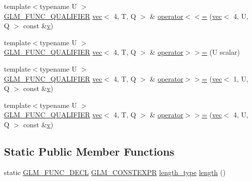 \begin{DoxyCompactItemize}
\item 
{\footnotesize template$<$typename U $>$ }\\\hyperlink{setup_8hpp_a33fdea6f91c5f834105f7415e2a64407}{G\+L\+M\+\_\+\+F\+U\+N\+C\+\_\+\+Q\+U\+A\+L\+I\+F\+I\+ER} \hyperlink{structglm_1_1vec}{vec}$<$ 4, T, Q $>$ \& \hyperlink{structglm_1_1vec_3_014_00_01_t_00_01_q_01_4_a0e69465cc359e717e6139e33aa441fde}{operator$<$$<$=} (\hyperlink{structglm_1_1vec}{vec}$<$ 4, U, Q $>$ const \&\hyperlink{_s_d_l__opengl_8h_a10a82eabcb59d2fcd74acee063775f90}{v})
\item 
{\footnotesize template$<$typename U $>$ }\\\hyperlink{setup_8hpp_a33fdea6f91c5f834105f7415e2a64407}{G\+L\+M\+\_\+\+F\+U\+N\+C\+\_\+\+Q\+U\+A\+L\+I\+F\+I\+ER} \hyperlink{structglm_1_1vec}{vec}$<$ 4, T, Q $>$ \& \hyperlink{structglm_1_1vec_3_014_00_01_t_00_01_q_01_4_a640417b459496600112faab1b74fcbf8}{operator$>$$>$=} (U scalar)
\item 
{\footnotesize template$<$typename U $>$ }\\\hyperlink{setup_8hpp_a33fdea6f91c5f834105f7415e2a64407}{G\+L\+M\+\_\+\+F\+U\+N\+C\+\_\+\+Q\+U\+A\+L\+I\+F\+I\+ER} \hyperlink{structglm_1_1vec}{vec}$<$ 4, T, Q $>$ \& \hyperlink{structglm_1_1vec_3_014_00_01_t_00_01_q_01_4_a83a91fd4b81cc0335d4310a2aed2f713}{operator$>$$>$=} (\hyperlink{structglm_1_1vec}{vec}$<$ 1, U, Q $>$ const \&\hyperlink{_s_d_l__opengl_8h_a10a82eabcb59d2fcd74acee063775f90}{v})
\item 
{\footnotesize template$<$typename U $>$ }\\\hyperlink{setup_8hpp_a33fdea6f91c5f834105f7415e2a64407}{G\+L\+M\+\_\+\+F\+U\+N\+C\+\_\+\+Q\+U\+A\+L\+I\+F\+I\+ER} \hyperlink{structglm_1_1vec}{vec}$<$ 4, T, Q $>$ \& \hyperlink{structglm_1_1vec_3_014_00_01_t_00_01_q_01_4_a44ce6a7a24c6f0b24eee2c09ae28796b}{operator$>$$>$=} (\hyperlink{structglm_1_1vec}{vec}$<$ 4, U, Q $>$ const \&\hyperlink{_s_d_l__opengl_8h_a10a82eabcb59d2fcd74acee063775f90}{v})
\end{DoxyCompactItemize}
\subsection*{Static Public Member Functions}
\begin{DoxyCompactItemize}
\item 
static \hyperlink{setup_8hpp_ab2d052de21a70539923e9bcbf6e83a51}{G\+L\+M\+\_\+\+F\+U\+N\+C\+\_\+\+D\+E\+CL} \hyperlink{setup_8hpp_a08b807947b47031d3a511f03f89645ad}{G\+L\+M\+\_\+\+C\+O\+N\+S\+T\+E\+X\+PR} \hyperlink{structglm_1_1vec_3_014_00_01_t_00_01_q_01_4_af1c8f56963141951f4a4724b47e072d9}{length\+\_\+type} \hyperlink{structglm_1_1vec_3_014_00_01_t_00_01_q_01_4_ac83fdb652378185c944b11f5cf35744d}{length} ()
\end{DoxyCompactItemize}
